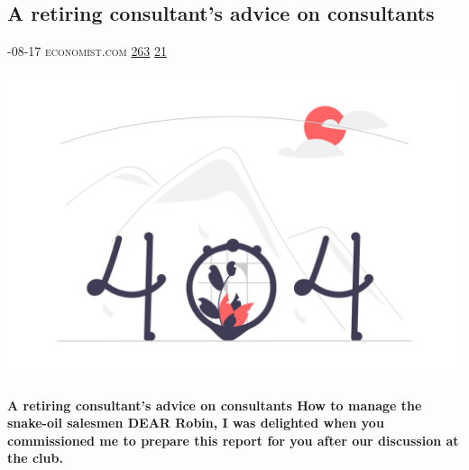 \documentclass[10pt,a4paper]{article}
\begin{document}
\begin{multicols*}{2}
\begin{minipage}{\linewidth}
\subsection{A retiring consultant’s advice on consultants}
\textsc{\footnotesize
{\scriptsize\faCalendar}-08-17 
{\scriptsize\faGlobe}\space 
economist.com 
{\scriptsize\faThumbsOUp}\space 
\href{http://news.ycombinator.com/item?id=37207237\&utm\_term=comment}{263} 
{\scriptsize\faComments}\space 
\href{http://news.ycombinator.com/item?id=37207237\&utm\_term=comment}{21} 
}
\par\medskip\noindent
\href{https://www.economist.com/business/2023/08/17/a-retiring-consultants-advice-on-consultants?utm\_source=hackernewsletter\&utm\_medium=email\&utm\_term=working}{
    \includegraphics[width=0.99\linewidth]{notfound.png}
}
\end{minipage}
\paragraph{}
\textbf{A retiring consultant’s advice on consultants
How to manage the snake-oil salesmen
DEAR Robin, I was delighted when you commissioned me to prepare this report for you after our discussion at the club.}

\end{multicols*}
\end{document}
